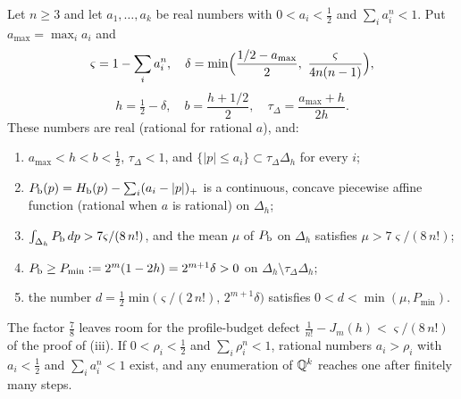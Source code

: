 \begin{lemma}\label{lem:qdr-auxiliary}
Let $n\ge3$ and let $a_1,\dots,a_k$ be real numbers with $0<a_i<\frac12$ and $\sum_ia_i^n<1$. Put
$a_{\max}=\max_ia_i$ and
\[
 \varsigma=1-\sum_ia_i^n,\quad
 \delta=\min\Bigl(\frac{1/2-a_{\max}}2,\ \frac{\varsigma}{4n(n-1)}\Bigr),
\]
\[
 h=\tfrac12-\delta,\quad b=\frac{h+1/2}2,\quad \tau_\Delta=\frac{a_{\max}+h}{2h}.
\]
These numbers are real (rational for rational $a$), and:
\begin{enumerate}[label=(\roman*)]
\item $a_{\max}<h<b<\frac12$, $\tau_\Delta<1$, and $\{|p|\le a_i\}\subset\tau_\Delta\Delta_h$ for every $i$;
\item $P_{\mathrm b}(p)=H_{\mathrm b}(p)-\sum_i(a_i-|p|)_+$ is a continuous, concave piecewise affine function (rational when $a$ is rational) on $\Delta_h$;
\item $\int_{\Delta_h}P_{\mathrm b}\,dp>7\varsigma/(8\,n!)$, and the mean $\mu$ of $P_{\mathrm b}$ on $\Delta_h$ satisfies $\mu>7\varsigma/(8\,n!)$;
\item $P_{\mathrm b}\ge P_{\min}:=2^m(1-2h)=2^{m+1}\delta>0$ on $\Delta_h\setminus\tau_\Delta\Delta_h$;
\item the number $d=\frac12\min\bigl(\varsigma/(2\,n!),\,2^{m+1}\delta\bigr)$ satisfies $0<d<\min(\mu,P_{\min})$.
\end{enumerate}
The factor $\frac78$ leaves room for the profile-budget defect $\frac1{n!}-J_m(h)<\varsigma/(8\,n!)$ of the proof of (iii). If
$0<\rho_i<\frac12$ and $\sum_i\rho_i^n<1$, rational numbers $a_i>\rho_i$ with $a_i<\frac12$ and $\sum_ia_i^n<1$ exist, and any
enumeration of $\mathbb{Q}^k$ reaches one after finitely many steps.
\end{lemma}

